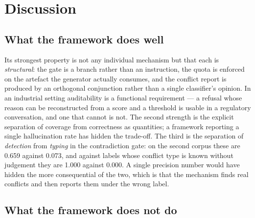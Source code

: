\documentclass[preprint,3p,times]{elsarticle}
\begin{document}
\section{Discussion}

\subsection{What the framework does well}

Its strongest property is not any individual mechanism but that each is
\emph{structural}: the gate is a branch rather than an instruction, the quota is
enforced on the artefact the generator actually consumes, and the conflict
report is produced by an orthogonal conjunction rather than a single
classifier's opinion. In an industrial setting auditability is a functional
requirement --- a refusal whose reason can be reconstructed from a score and a
threshold is usable in a regulatory conversation, and one that cannot is not.
The second strength is the explicit separation of coverage from correctness as
quantities; a framework reporting a single hallucination rate has hidden the
trade-off. The third is the separation of \emph{detection} from \emph{typing}
in the contradiction gate: on the second corpus these are 0.659
against 0.073, and against labels whose conflict type is known
without judgement they are 1.000 against
0.000. A single precision number would have hidden
the more consequential of the two, which is that the mechanism finds real
conflicts and then reports them under the wrong label.

\subsection{What the framework does not do}
\end{document}
